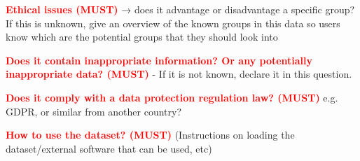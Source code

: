 \documentclass[letterpaper,11pt]{article}
\begin{document}
\textbf{\textcolor{red}{Ethical issues (MUST)}} → does it advantage or disadvantage a specific group? If this is unknown, give an overview of the known groups in this data so users know which are the potential groups that they should look into

\textbf{\textcolor{red}{Does it contain inappropriate information? Or any potentially inappropriate data? (MUST)}} - If it is not known, declare it in this question. 

\textbf{\textcolor{red}{Does it comply with a data protection regulation law? (MUST)}} e.g. GDPR, or similar from another country?


\textbf{\textcolor{red}{How to use the dataset? (MUST)}} (Instructions on loading the dataset/external software that can be used, etc)
\end{document}
